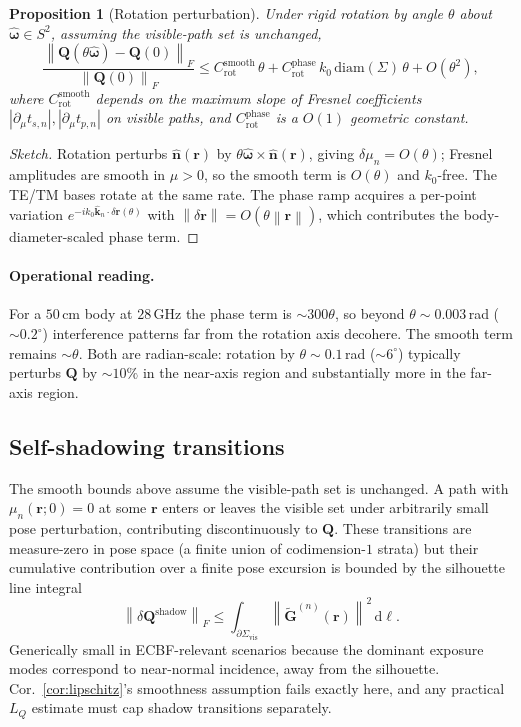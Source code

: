 \documentclass[11pt,a4paper]{article}
\newtheorem{proposition}[theorem]{Proposition}
\theoremstyle{definition}
\newcommand{\rr}{\mathbf{r}}
\newcommand{\nh}{\hat{\mathbf{n}}}
\newcommand{\kh}{\hat{\mathbf{k}}}
\newcommand{\Q}{\mathbf{Q}}
\newcommand{\Gt}{\widetilde{\mathbf{G}}}
\newcommand{\Sigmaset}{\Sigma}
\newcommand{\diff}{\mathrm{d}}
\newcommand{\norm}[1]{\left\lVert #1 \right\rVert}
\begin{document}
\begin{proposition}[Rotation perturbation]
\label{prop:rotation}
Under rigid rotation by angle $\theta$ about $\hat{\boldsymbol\omega}\in S^2$,
assuming the visible-path set is unchanged,
\begin{equation}
  \frac{\norm{\Q(\theta\hat{\boldsymbol\omega})-\Q(0)}_F}{\norm{\Q(0)}_F}
  \le C_{\mathrm{rot}}^{\mathrm{smooth}}\,\theta
    + C_{\mathrm{rot}}^{\mathrm{phase}}\,k_0\,\mathrm{diam}(\Sigmaset)\,\theta
    + O(\theta^2),
\end{equation}
where $C_{\mathrm{rot}}^{\mathrm{smooth}}$ depends on the maximum slope
of Fresnel coefficients $|\partial_\mu t_{s,n}|,|\partial_\mu t_{p,n}|$
on visible paths, and $C_{\mathrm{rot}}^{\mathrm{phase}}$ is a
$O(1)$ geometric constant.
\end{proposition}

\begin{proof}[Sketch]
Rotation perturbs $\nh(\rr)$ by $\theta\hat{\boldsymbol\omega}\times\nh(\rr)$,
giving $\delta\mu_n=O(\theta)$; Fresnel amplitudes are smooth in $\mu>0$,
so the smooth term is $O(\theta)$ and $k_0$-free. The TE/TM bases rotate
at the same rate. The phase ramp acquires a per-point variation
$e^{-ik_0\kh_n\cdot\delta\rr(\theta)}$ with $\norm{\delta\rr}=O(\theta\norm{\rr})$,
which contributes the body-diameter-scaled phase term.
\end{proof}

\paragraph{Operational reading.}
For a $50$\,cm body at $28$\,GHz the phase term is $\sim\!300\theta$,
so beyond $\theta\!\sim\!0.003$\,rad ($\sim\!0.2^\circ$) interference
patterns far from the rotation axis decohere. The smooth term remains
$\sim\!\theta$. Both are radian-scale: rotation by $\theta\!\sim\!0.1$\,rad
($\sim\!6^\circ$) typically perturbs $\Q$ by $\sim\!10\%$ in the
near-axis region and substantially more in the far-axis region.

\subsection{Self-shadowing transitions}
\label{sec:self-shadow}

The smooth bounds above assume the visible-path set is unchanged. A
path with $\mu_n(\rr;0)=0$ at some $\rr$ enters or leaves the visible
set under arbitrarily small pose perturbation, contributing
discontinuously to $\Q$. These transitions are measure-zero in pose
space (a finite union of codimension-$1$ strata) but their cumulative
contribution over a finite pose excursion is bounded by the silhouette
line integral
\begin{equation}
  \norm{\delta\Q^{\mathrm{shadow}}}_F \le
  \int_{\partial\Sigmaset_{\mathrm{vis}}}
  \norm{\Gt^{(n)}(\rr)}^2\,\diff\ell.
\end{equation}
Generically small in ECBF-relevant scenarios because the dominant
exposure modes correspond to near-normal incidence, away from the
silhouette. Cor.~\ref{cor:lipschitz}'s smoothness assumption fails
exactly here, and any practical $L_Q$ estimate must cap shadow
transitions separately.
\end{document}
